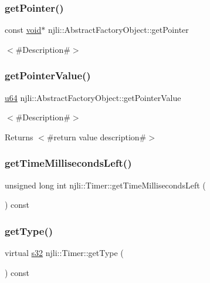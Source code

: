 \subsubsection{\texorpdfstring{get\+Pointer()}{getPointer()}}
{\footnotesize\ttfamily const \mbox{\hyperlink{_thread_8h_af1e856da2e658414cb2456cb6f7ebc66}{void}}$\ast$ njli\+::\+Abstract\+Factory\+Object\+::get\+Pointer}

$<$\#\+Description\#$>$ \mbox{\label{classnjli_1_1_timer_a4ffddf141a426a5a07d0ac19f1913811}} 
\subsubsection{\texorpdfstring{get\+Pointer\+Value()}{getPointerValue()}}
{\footnotesize\ttfamily \mbox{\hyperlink{_util_8h_ad758b7a5c3f18ed79d2fcd23d9f16357}{u64}} njli\+::\+Abstract\+Factory\+Object\+::get\+Pointer\+Value}

$<$\#\+Description\#$>$

\begin{DoxyReturn}{Returns}
$<$\#return value description\#$>$ 
\end{DoxyReturn}
\mbox{\label{classnjli_1_1_timer_a84efdb170831202bb478521f3c65a55a}} 
\subsubsection{\texorpdfstring{get\+Time\+Milliseconds\+Left()}{getTimeMillisecondsLeft()}}
{\footnotesize\ttfamily unsigned long int njli\+::\+Timer\+::get\+Time\+Milliseconds\+Left (\begin{DoxyParamCaption}{ }\end{DoxyParamCaption}) const}

\mbox{\label{classnjli_1_1_timer_ad83006f62efbd2da2155e28ea15072f8}} 
\subsubsection{\texorpdfstring{get\+Type()}{getType()}}
{\footnotesize\ttfamily virtual \mbox{\hyperlink{_util_8h_aa62c75d314a0d1f37f79c4b73b2292e2}{s32}} njli\+::\+Timer\+::get\+Type (\begin{DoxyParamCaption}{ }\end{DoxyParamCaption}) const\hspace{0.3cm}{\ttfamily [virtual]}}

